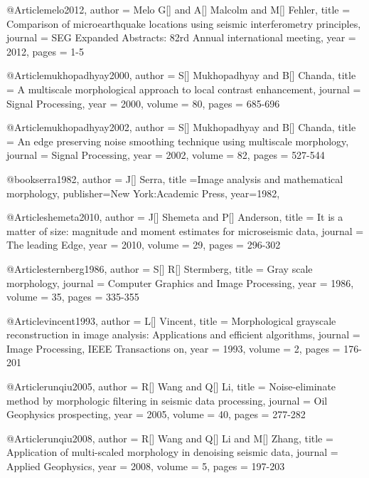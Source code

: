      @Article{melo2012,
  author = 	 {Melo G[] and A[] Malcolm and M[] Fehler},
  title = 	 {Comparison of microearthquake locations using seismic interferometry principles},
  journal = 	 {SEG Expanded Abstracts: 82rd Annual international meeting},
  year = 	 2012,
  pages = 	 {1-5}}  
  
      @Article{mukhopadhyay2000,
  author = 	 {S[] Mukhopadhyay and B[] Chanda},
  title = 	 {A multiscale morphological approach to local contrast enhancement},
  journal = 	 {Signal Processing},
  year = 	 2000,
  volume = 	 80,
  pages = 	 {685-696}} 


      @Article{mukhopadhyay2002,
  author = 	 {S[] Mukhopadhyay and B[] Chanda},
  title = 	 {An edge preserving noise smoothing technique using
multiscale morphology},
  journal = 	 {Signal Processing},
  year = 	 2002,
  volume = 	 82,
  pages = 	 {527-544}} 
  
  
@book{serra1982,
  author = {J[] Serra},
  title ={Image analysis and mathematical morphology},
  publisher={New York:Academic Press},
  year=1982,
}

       @Article{shemeta2010,
  author = 	 {J[] Shemeta and P[] Anderson},
  title = 	 {It is a matter of size: magnitude and moment estimates for microseismic data},
  journal = 	 {The leading Edge},
  year = 	 2010,
  volume = 	 29,
  pages = 	 {296-302}} 
  
         @Article{sternberg1986,
  author = 	 {S[] R[] Stermberg},
  title = 	 {Gray scale morphology},
  journal = 	 {Computer Graphics and Image Processing},
  year = 	 1986,
  volume = 	 35,
  pages = 	 {335-355}}  
  
          @Article{vincent1993,
  author = 	 {L[] Vincent},
  title = 	 {Morphological grayscale reconstruction in image analysis: Applications and efficient algorithms},
  journal = 	 {Image Processing, IEEE Transactions on},
  year = 	 1993,
  volume = 	 2,
  pages = 	 {176-201}}  
  
          @Article{runqiu2005,
  author = 	 {R[] Wang and Q[] Li},
  title = 	 {Noise-eliminate method by morphologic filtering in seismic data processing},
  journal = 	 {Oil Geophysics prospecting},
  year = 	 2005,
  volume = 	 40,
  pages = 	 {277-282}}  
  
  
            @Article{runqiu2008,
  author = 	 {R[] Wang and Q[] Li and M[] Zhang},
  title = 	 {Application of multi-scaled morphology in denoising seismic data},
  journal = 	 {Applied Geophysics},
  year = 	 2008,
  volume = 	 5,
  pages = 	 {197-203}}    
 
